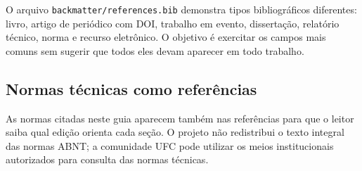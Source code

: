 O arquivo \texttt{backmatter/references.bib} demonstra tipos bibliográficos diferentes: livro, artigo de periódico com DOI, trabalho em evento, dissertação, relatório técnico, norma e recurso eletrônico. O objetivo é exercitar os campos mais comuns sem sugerir que todos eles devam aparecer em todo trabalho.


\subsection{Normas técnicas como referências}

As normas citadas neste guia aparecem também nas referências para que o leitor saiba qual edição orienta cada seção. O projeto não redistribui o texto integral das normas ABNT; a comunidade UFC pode utilizar os meios institucionais autorizados para consulta das normas técnicas.


